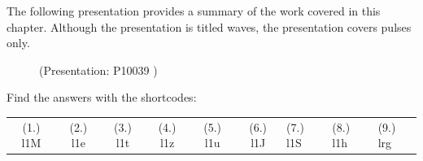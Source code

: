       

    

\label{m38802*fs-id1165499443114} The following presentation provides a summary of the work covered in this chapter. Although the presentation is titled waves, the presentation covers pulses only.
      
    \setcounter{subfigure}{0}


	\begin{figure}[H] %
    
    \label{m38802*slidesharemedia}\label{m38802*slideshareflash} { (Presentation:  P10039 )}
      
      \vspace{2pt}
    \vspace{.1in}
    
    

 \end{figure}   

    \addtocounter{footnote}{-0}
    
\par 
  \label{m38802*eip-812}
\par {} Find the answers with the shortcodes:
 \par \begin{tabular}[h]{cccccc}
 (1.) l1M  &  (2.) l1e  &  (3.) l1t  &  (4.) l1z  &  (5.) l1u  &  (6.) l1J  &  (7.) l1S  &  (8.) l1h  &  (9.) lrg  & \end{tabular}



